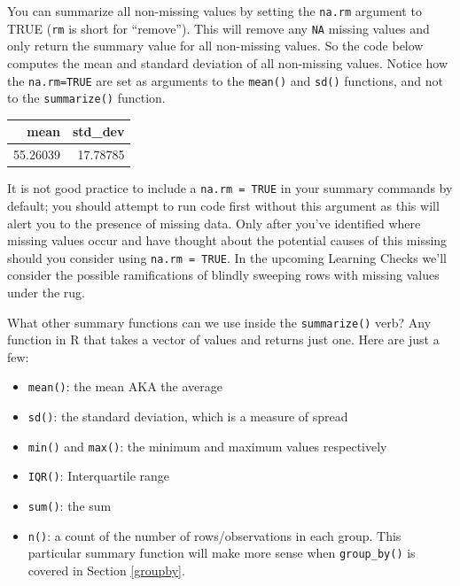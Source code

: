 \documentclass[12pt,]{krantz}
\makeatletter
\newenvironment{Shaded}{\begin{snugshade}}{\end{snugshade}}
\newcommand{\KeywordTok}[1]{\textcolor[rgb]{0.27,0.27,0.27}{\textbf{#1}}}
\newcommand{\DataTypeTok}[1]{\textcolor[rgb]{0.27,0.27,0.27}{#1}}
\newcommand{\StringTok}[1]{\textcolor[rgb]{0.5,0.5,0.5}{#1}}
\newcommand{\OtherTok}[1]{\textcolor[rgb]{0.37,0.37,0.37}{#1}}
\newcommand{\OperatorTok}[1]{\textcolor[rgb]{0.43,0.43,0.43}{\textbf{#1}}}
\newcommand{\NormalTok}[1]{#1}
\providecommand{\tightlist}{%
  \setlength{\itemsep}{0pt}\setlength{\parskip}{0pt}}
\newenvironment{kframe}{%
\medskip{}
\setlength{\fboxsep}{.8em}
 \def\at@end@of@kframe{}%
 \ifinner\ifhmode%
  \def\at@end@of@kframe{\end{minipage}}%
  \begin{minipage}{\columnwidth}%
 \fi\fi%
 \def\FrameCommand##1{\hskip\@totalleftmargin \hskip-\fboxsep
 \colorbox{shadecolor}{##1}\hskip-\fboxsep
     \hskip-\linewidth \hskip-\@totalleftmargin \hskip\columnwidth}%
 \MakeFramed {\advance\hsize-\width
   \@totalleftmargin\z@ \linewidth\hsize
   \@setminipage}}%
 {\par\unskip\endMakeFramed%
 \at@end@of@kframe}
\renewenvironment{Shaded}{\begin{kframe}}{\end{kframe}}
\theoremstyle{definition}
\theoremstyle{definition}
\theoremstyle{definition}
\theoremstyle{remark}
\makeatother
\begin{document}
You can summarize all non-missing values by setting the \texttt{na.rm}
argument to TRUE (\texttt{rm} is short for ``remove''). This will remove
any \texttt{NA} missing values and only return the summary value for all
non-missing values. So the code below computes the mean and standard
deviation of all non-missing values. Notice how the \texttt{na.rm=TRUE}
are set as arguments to the \texttt{mean()} and \texttt{sd()} functions,
and not to the \texttt{summarize()} function.

\begin{Shaded}
\end{Shaded}

\begin{table}[H]
\centering\begingroup\fontsize{10}{12}\selectfont

\begin{tabular}{r|r}
\hline
mean & std\_dev\\
\hline
55.26039 & 17.78785\\
\hline
\end{tabular}
\endgroup{}
\end{table}

It is not good practice to include a \texttt{na.rm\ =\ TRUE} in your
summary commands by default; you should attempt to run code first
without this argument as this will alert you to the presence of missing
data. Only after you've identified where missing values occur and have
thought about the potential causes of this missing should you consider
using \texttt{na.rm\ =\ TRUE}. In the upcoming Learning Checks we'll
consider the possible ramifications of blindly sweeping rows with
missing values under the rug.

What other summary functions can we use inside the \texttt{summarize()}
verb? Any function in R that takes a vector of values and returns just
one. Here are just a few:

\begin{itemize}
\tightlist
\item
  \texttt{mean()}: the mean AKA the average
\item
  \texttt{sd()}: the standard deviation, which is a measure of spread
\item
  \texttt{min()} and \texttt{max()}: the minimum and maximum values
  respectively
\item
  \texttt{IQR()}: Interquartile range
\item
  \texttt{sum()}: the sum
\item
  \texttt{n()}: a count of the number of rows/observations in each
  group. This particular summary function will make more sense when
  \texttt{group\_by()} is covered in Section \ref{groupby}.
\end{itemize}
\end{document}
